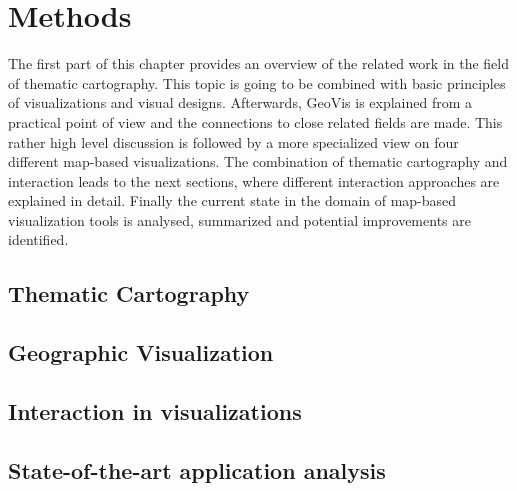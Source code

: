 \section{Methods}
The first part of this chapter provides an overview of the related work in the field of
thematic cartography. This topic is going to be combined with basic principles of visualizations and visual designs. Afterwards, \ac{GeoVis} is explained from a practical point of view and the connections to close related fields are made. This rather high level discussion is followed by a more specialized view on four different map-based visualizations. The combination of thematic cartography and interaction leads to the next sections, where different interaction approaches are explained in detail. Finally the current state in the domain of map-based visualization tools is analysed, summarized and potential improvements are identified.

\subsection{Thematic Cartography}
\label{s:cartography}


\subsection{Geographic Visualization}


\subsection{Interaction in visualizations}
\label{s:interaction}


\subsection{State-of-the-art application analysis}
